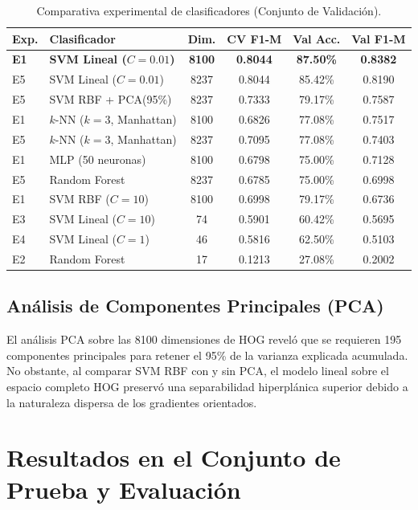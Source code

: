 \documentclass[journal,compsoc,twoside]{IEEEtran}
\begin{document}
\begin{table}[htbp]
\caption{Comparativa experimental de clasificadores (Conjunto de Validación).}
\label{tab:comparison}
\centering
\begin{tabular}{llcccc}
\toprule
\textbf{Exp.} & \textbf{Clasificador} & \textbf{Dim.} & \textbf{CV F1-M} & \textbf{Val Acc.} & \textbf{Val F1-M} \\
\midrule
\textbf{E1} & \textbf{SVM Lineal ($C=0.01$)} & \textbf{8100} & \textbf{0.8044} & \textbf{87.50\%} & \textbf{0.8382} \\
E5 & SVM Lineal ($C=0.01$) & 8237 & 0.8044 & 85.42\% & 0.8190 \\
E5 & SVM RBF + PCA(95\%) & 8237 & 0.7333 & 79.17\% & 0.7587 \\
E1 & $k$-NN ($k=3$, Manhattan) & 8100 & 0.6826 & 77.08\% & 0.7517 \\
E5 & $k$-NN ($k=3$, Manhattan) & 8237 & 0.7095 & 77.08\% & 0.7403 \\
E1 & MLP (50 neuronas) & 8100 & 0.6798 & 75.00\% & 0.7128 \\
E5 & Random Forest & 8237 & 0.6785 & 75.00\% & 0.6998 \\
E1 & SVM RBF ($C=10$) & 8100 & 0.6998 & 79.17\% & 0.6736 \\
E3 & SVM Lineal ($C=10$) & 74 & 0.5901 & 60.42\% & 0.5695 \\
E4 & SVM Lineal ($C=1$) & 46 & 0.5816 & 62.50\% & 0.5103 \\
E2 & Random Forest & 17 & 0.1213 & 27.08\% & 0.2002 \\
\bottomrule
\end{tabular}
\end{table}

\subsection{Análisis de Componentes Principales (PCA)}
El análisis PCA sobre las 8100 dimensiones de HOG reveló que se requieren 195 componentes principales para retener el 95\% de la varianza explicada acumulada. No obstante, al comparar SVM RBF con y sin PCA, el modelo lineal sobre el espacio completo HOG preservó una separabilidad hiperplánica superior debido a la naturaleza dispersa de los gradientes orientados.

\section{Resultados en el Conjunto de Prueba y Evaluación}
\end{document}
